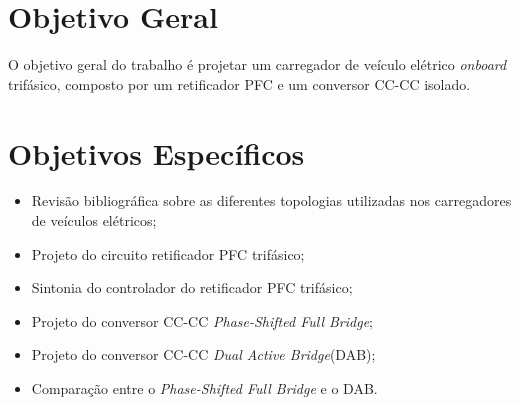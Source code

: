 \section{Objetivo Geral}
O objetivo geral do trabalho é projetar um carregador de veículo elétrico \textit{onboard}
trifásico, composto por um retificador PFC e um conversor CC-CC isolado.
\section{Objetivos Específicos}
\begin{itemize}
    \item Revisão bibliográfica sobre as diferentes topologias utilizadas nos carregadores de veículos
          elétricos;
    \item Projeto do circuito retificador PFC trifásico;
    \item Sintonia do controlador do retificador PFC trifásico;
    \item Projeto do conversor CC-CC \textit{Phase-Shifted Full Bridge};
    \item Projeto do conversor CC-CC \textit{Dual Active Bridge}(DAB);
    \item Comparação entre o \textit{Phase-Shifted Full Bridge} e o DAB.
\end{itemize}
